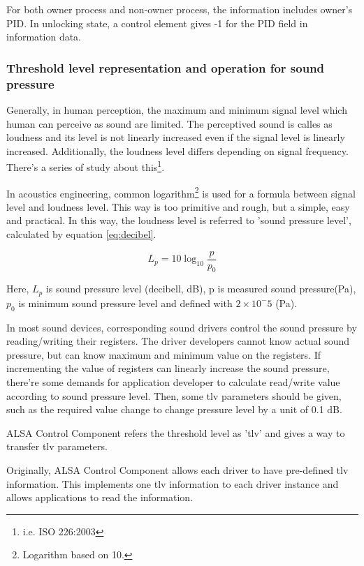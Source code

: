 \documentclass[onecolumn]{article}
\begin{document}
For both owner process and non-owner process, the information includes owner's PID. In unlocking state, a control element gives -1 for the PID field in information data.


\subsubsection{Threshold level representation and operation for sound pressure}

Generally, in human perception, the maximum and minimum signal level which human can perceive as sound are limited. The perceptived sound is calles as loudness and its level is not linearly increased even if the signal level is linearly increased. Additionally, the loudness level differs depending on signal frequency. There's a series of study about this\footnote{i.e. ISO 226:2003}.

In acoustics engineering, common logarithm\footnote{Logarithm based on 10.} is used for a formula between signal level and loudness level. This way is too primitive and rough, but a simple, easy and practical. In this way, the loudness level is referred to 'sound pressure level', calculated by equation \ref{eq:decibel}.

\begin{equation}
L_p = 10 \log_{10} \frac{p}{p_0} \label{eq:decibel}
\end{equation}

Here, $L_p$ is sound pressure level (decibell, dB), p is measured sound pressure(Pa), $p_0$ is minimum sound pressure level and defined with $2 \times 10^-5$ (Pa).

In most sound devices, corresponding sound drivers control the sound pressure by reading/writing their registers. The driver developers cannot know actual sound pressure, but can know maximum and minimum value on the registers. If incrementing the value of registers can linearly increase the sound pressure, there're some demands for application developer to calculate read/write value according to sound pressure level. Then, some tlv parameters should be given, such as the required value change to change pressure level by a unit of 0.1 dB.

ALSA Control Component refers the threshold level as 'tlv' and gives a way to transfer tlv parameters.

Originally, ALSA Control Component allows each driver to have pre-defined tlv information. This implements one tlv information to each driver instance and allows applications to read the information.
\end{document}
